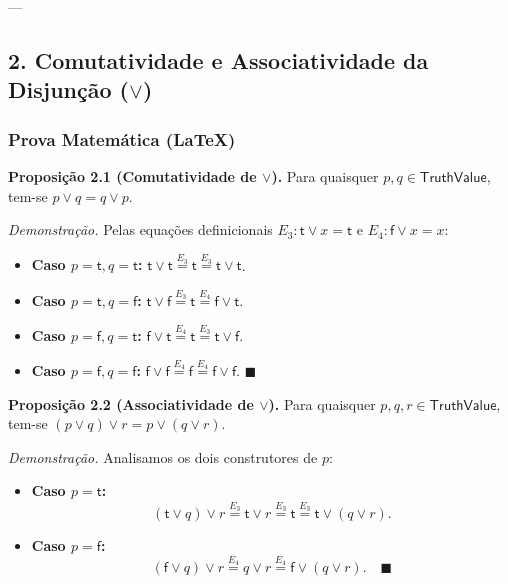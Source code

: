 \documentclass[11pt,a4paper]{scrartcl}
\begin{document}
---
\subsection{2. Comutatividade e Associatividade da Disjunção (\(\lor\))}
\label{sec:orga45e682}

\subsubsection{Prova Matemática (\LaTeX{})}
\label{sec:org98a5902}
\textbf{Proposição 2.1 (Comutatividade de \(\lor\)).} Para quaisquer \(p, q \in \mathsf{TruthValue}\), tem-se \(p \lor q = q \lor p\).

\emph{Demonstração.} Pelas equações definicionais \(E_3: \mathsf{t} \lor x = \mathsf{t}\) e \(E_4: \mathsf{f} \lor x = x\):
\begin{itemize}
\item \textbf{Caso \(p = \mathsf{t}, q = \mathsf{t}\):} \(\mathsf{t} \lor \mathsf{t} \stackrel{E_3}{=} \mathsf{t} \stackrel{E_3}{=} \mathsf{t} \lor \mathsf{t}\).
\item \textbf{Caso \(p = \mathsf{t}, q = \mathsf{f}\):} \(\mathsf{t} \lor \mathsf{f} \stackrel{E_3}{=} \mathsf{t} \stackrel{E_4}{=} \mathsf{f} \lor \mathsf{t}\).
\item \textbf{Caso \(p = \mathsf{f}, q = \mathsf{t}\):} \(\mathsf{f} \lor \mathsf{t} \stackrel{E_4}{=} \mathsf{t} \stackrel{E_3}{=} \mathsf{t} \lor \mathsf{f}\).
\item \textbf{Caso \(p = \mathsf{f}, q = \mathsf{f}\):} \(\mathsf{f} \lor \mathsf{f} \stackrel{E_4}{=} \mathsf{f} \stackrel{E_4}{=} \mathsf{f} \lor \mathsf{f}\). \(\blacksquare\)
\end{itemize}

\textbf{Proposição 2.2 (Associatividade de \(\lor\)).} Para quaisquer \(p, q, r \in \mathsf{TruthValue}\), tem-se \((p \lor q) \lor r = p \lor (q \lor r)\).

\emph{Demonstração.} Analisamos os dois construtores de \(p\):
\begin{itemize}
\item \textbf{Caso \(p = \mathsf{t}\):}
$$(\mathsf{t} \lor q) \lor r \stackrel{E_3}{=} \mathsf{t} \lor r \stackrel{E_3}{=} \mathsf{t} \stackrel{E_3}{=} \mathsf{t} \lor (q \lor r).$$
\item \textbf{Caso \(p = \mathsf{f}\):}
$$(\mathsf{f} \lor q) \lor r \stackrel{E_4}{=} q \lor r \stackrel{E_4}{=} \mathsf{f} \lor (q \lor r). \quad \blacksquare$$
\end{itemize}
\end{document}
